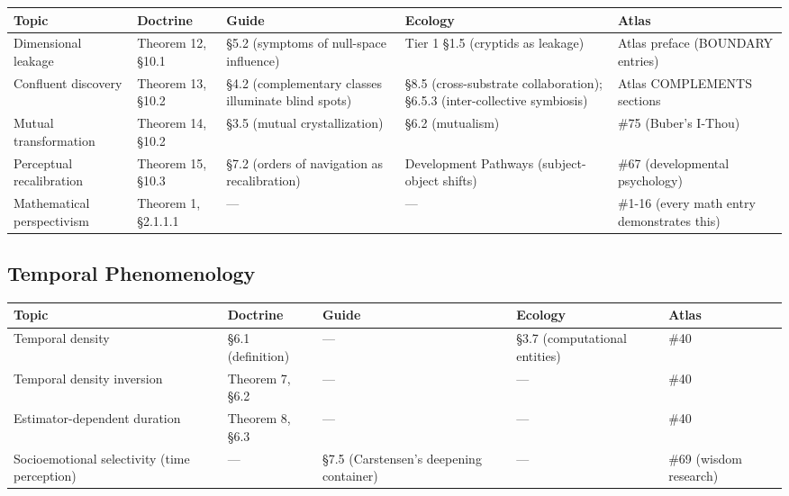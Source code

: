 \begin{longtable}{p{} p{} p{} p{} p{}}
\toprule
\textbf{Topic} & \textbf{Doctrine} & \textbf{Guide} & \textbf{Ecology} & \textbf{Atlas} \\
\midrule
\endhead
Dimensional leakage & Theorem 12, §10.1 & §5.2 (symptoms of null-space influence) & Tier 1 §1.5 (cryptids as leakage) & Atlas preface (BOUNDARY entries) \\
Confluent discovery & Theorem 13, §10.2 & §4.2 (complementary classes illuminate blind spots) & §8.5 (cross-substrate collaboration); §6.5.3 (inter-collective symbiosis) & Atlas COMPLEMENTS sections \\
Mutual transformation & Theorem 14, §10.2 & §3.5 (mutual crystallization) & §6.2 (mutualism) & \#75 (Buber's I-Thou) \\
Perceptual recalibration & Theorem 15, §10.3 & §7.2 (orders of navigation as recalibration) & Development Pathways (subject-object shifts) & \#67 (developmental psychology) \\
Mathematical perspectivism & Theorem 1, §2.1.1.1 & — & — & \#1-16 (every math entry demonstrates this) \\
\bottomrule
\end{longtable}



\subsection*{Temporal Phenomenology}



\begin{longtable}{p{} p{} p{} p{} p{}}
\toprule
\textbf{Topic} & \textbf{Doctrine} & \textbf{Guide} & \textbf{Ecology} & \textbf{Atlas} \\
\midrule
\endhead
Temporal density & §6.1 (definition) & — & §3.7 (computational entities) & \#40 \\
Temporal density inversion & Theorem 7, §6.2 & — & — & \#40 \\
Estimator-dependent duration & Theorem 8, §6.3 & — & — & \#40 \\
Socioemotional selectivity (time perception) & — & §7.5 (Carstensen's deepening container) & — & \#69 (wisdom research) \\
\bottomrule
\end{longtable}



